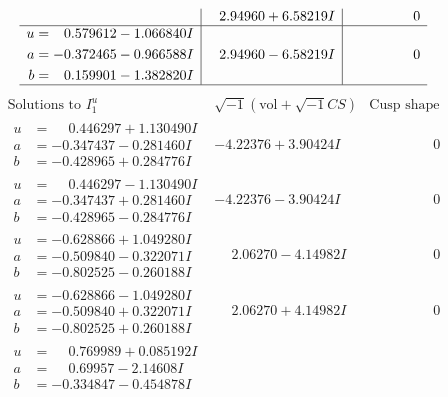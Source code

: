 \documentclass[1p]{elsarticle_modified}
\theoremstyle{definition}
\newcommand{\I}{\sqrt{-1}}
\begin{document}
$$\begin{array}{c|c|c}
 & \phantom{-}2.94960 + 6.58219 I & \phantom{-0.000000 } 0 \\ \hline\begin{aligned}
u &= \phantom{-}0.579612 - 1.066840 I \\
a &= -0.372465 - 0.966588 I \\
b &= \phantom{-}0.159901 - 1.382820 I\end{aligned}
 & \phantom{-}2.94960 - 6.58219 I & \phantom{-0.000000 } 0\\
 \hline 
 \end{array}$$\newpage$$\begin{array}{c|c|c}  
\text{Solutions to }I^u_{1}& \I (\text{vol} + \sqrt{-1}CS) & \text{Cusp shape}\\
 \hline 
\begin{aligned}
u &= \phantom{-}0.446297 + 1.130490 I \\
a &= -0.347437 - 0.281460 I \\
b &= -0.428965 + 0.284776 I\end{aligned}
 & -4.22376 + 3.90424 I & \phantom{-0.000000 } 0 \\ \hline\begin{aligned}
u &= \phantom{-}0.446297 - 1.130490 I \\
a &= -0.347437 + 0.281460 I \\
b &= -0.428965 - 0.284776 I\end{aligned}
 & -4.22376 - 3.90424 I & \phantom{-0.000000 } 0 \\ \hline\begin{aligned}
u &= -0.628866 + 1.049280 I \\
a &= -0.509840 - 0.322071 I \\
b &= -0.802525 - 0.260188 I\end{aligned}
 & \phantom{-}2.06270 - 4.14982 I & \phantom{-0.000000 } 0 \\ \hline\begin{aligned}
u &= -0.628866 - 1.049280 I \\
a &= -0.509840 + 0.322071 I \\
b &= -0.802525 + 0.260188 I\end{aligned}
 & \phantom{-}2.06270 + 4.14982 I & \phantom{-0.000000 } 0 \\ \hline\begin{aligned}
u &= \phantom{-}0.769989 + 0.085192 I \\
a &= \phantom{-}0.69957 - 2.14608 I \\
b &= -0.334847 - 0.454878 I\end{aligned}

\end{array}$$
\end{document}

